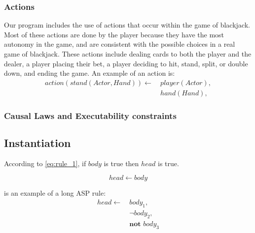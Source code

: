 \documentclass{article}
\begin{document}
\subsubsection{Actions}

Our program includes the use of actions that occur within the game of blackjack.
Most of these actions are done by the player because they have the most autonomy in the game,
and are consistent with the possible choices in a real game of blackjack.
These actions include dealing cards to both the player and the dealer, a player placing their bet,
a player deciding to hit, stand, split, or double down, and ending the game.
An example of an action is:
\begin{equation}
    \begin{split}
        action(stand(Actor, Hand)) \leftarrow \
            & player(Actor), \\
            & hand(Hand),
    \end{split}
\end{equation}

\subsubsection{Causal Laws and Executability constraints}

\subsection{Instantiation}


According to \cref{eq:rule_1}, if $body$ is true then $head$ is true.

\begin{equation}
    \label{eq:rule_1}
    head \leftarrow body
\end{equation}

 is an example of a long ASP rule:
\begin{equation}
\begin{split}
    \label{eq:rule_2}
    head \leftarrow \
        & body_1, \\
        & \neg body_2, \\
        & \textbf{not } body_3
\end{split}
\end{equation}
\end{document}
